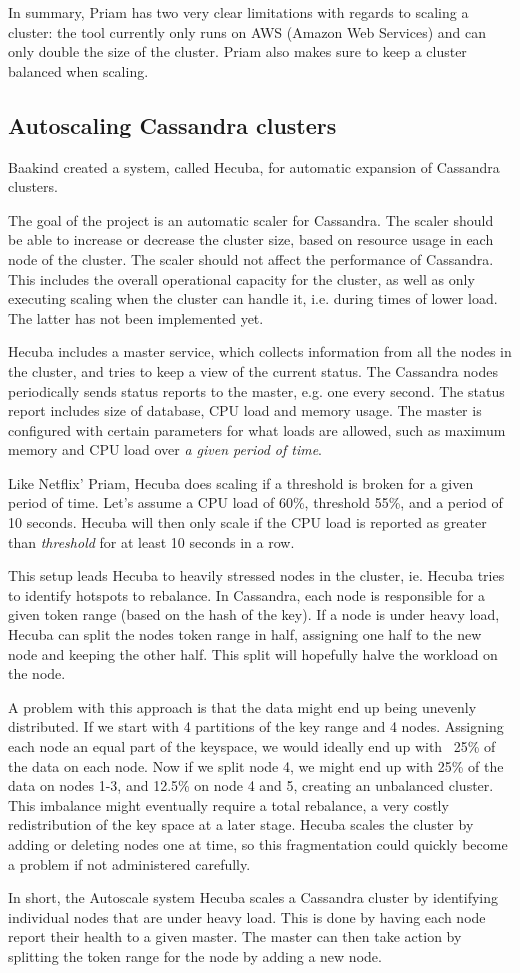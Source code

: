 In summary, Priam has two very clear limitations with regards to scaling a cluster: the tool currently only runs on AWS (Amazon Web Services) and can only double the size of the cluster. Priam also makes sure to keep a cluster balanced when scaling.

\subsection{Autoscaling Cassandra clusters}

Baakind\cite{baakind} created a system, called Hecuba, for automatic expansion of Cassandra clusters.

The goal of the project is an automatic scaler for Cassandra. The scaler should be able to increase or decrease the cluster size, based on resource usage in each node of the cluster.
The scaler should not affect the performance of Cassandra. This includes the overall operational capacity for the cluster, as well as only executing scaling when the cluster can handle it, i.e. during times of lower load. The latter has not been implemented yet.

Hecuba includes a master service, which collects information from all the nodes in the cluster, and tries to keep a view of the current status. The Cassandra nodes periodically sends status reports to the master, e.g. one every second. The status report includes size of database, CPU load and memory usage. The master is configured with certain parameters for what loads are allowed, such as maximum memory and CPU load over \emph{a given period of time}.

Like Netflix' Priam, Hecuba does scaling if a threshold is broken for a given period of time. Let's assume a CPU load of 60\%, threshold 55\%, and a period of 10 seconds. Hecuba will then only scale if the CPU load is reported as greater than \emph{threshold} for at least 10 seconds in a row.

This setup leads Hecuba to heavily stressed nodes in the cluster, ie. Hecuba tries to identify hotspots to rebalance. 
In Cassandra, each node is responsible for a given token range (based on the hash of the key). If a node is under heavy load, Hecuba can split the nodes token range in half, assigning one half to the new node and keeping the other half. This split will hopefully halve the workload on the node.

A problem with this approach is that the data might end up being unevenly distributed. If we start with 4 partitions of the key range and 4 nodes. Assigning each node an equal part of the keyspace, we would ideally end up with ~25\% of the data on each node. Now if we split node 4, we might end up with 25\% of the data on nodes 1-3, and 12.5\% on node 4 and 5, creating an unbalanced cluster. This imbalance might eventually require a total rebalance, a very costly redistribution of the key space at a later stage. Hecuba scales the cluster by adding or deleting nodes one at time, so this fragmentation could quickly become a problem if not administered carefully.

In short, the Autoscale system Hecuba scales a Cassandra cluster by identifying individual nodes that are under heavy load. This is done by having each node report their health to a given master. The master can then take action by splitting the token range for the node by adding a new node.




